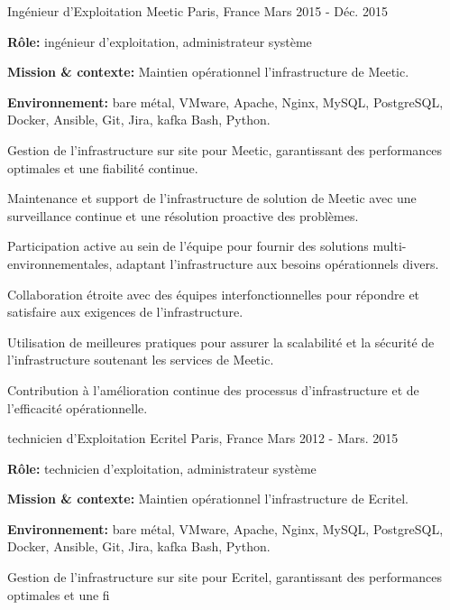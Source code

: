 \begin{cventries}
\cventry
{Ingénieur d'Exploitation} %
{Meetic} %
{Paris, France} %
{Mars 2015 - Déc. 2015} %
{
  \begin{cvitems} %
    \item {\textbf{Rôle:} ingénieur d'exploitation, administrateur système}
    \item {\textbf{Mission \& contexte:} Maintien opérationnel l'infrastructure de Meetic.}
    \item {\textbf{Environnement:} bare métal, VMware, Apache, Nginx, MySQL, PostgreSQL, Docker, Ansible, Git, Jira, kafka Bash, Python.}
    \item {Gestion de l'infrastructure sur site pour Meetic, garantissant des performances optimales et une fiabilité continue.}
    \item {Maintenance et support de l'infrastructure de solution de Meetic avec une surveillance continue et une résolution proactive des problèmes.}
    \item {Participation active au sein de l'équipe pour fournir des solutions multi-environnementales, adaptant l'infrastructure aux besoins opérationnels divers.}
    \item {Collaboration étroite avec des équipes interfonctionnelles pour répondre et satisfaire aux exigences de l'infrastructure.}
    \item {Utilisation de meilleures pratiques pour assurer la scalabilité et la sécurité de l'infrastructure soutenant les services de Meetic.}
    \item {Contribution à l'amélioration continue des processus d'infrastructure et de l'efficacité opérationnelle.}
  \end{cvitems}
}

\cventry
{technicien d'Exploitation} %
{Ecritel} %
{Paris, France} %
{Mars 2012 - Mars. 2015} %
{
  \begin{cvitems} %
    \item {\textbf{Rôle:} technicien d'exploitation, administrateur système}
    \item {\textbf{Mission \& contexte:} Maintien opérationnel l'infrastructure de Ecritel.}
    \item {\textbf{Environnement:} bare métal, VMware, Apache, Nginx, MySQL, PostgreSQL, Docker, Ansible, Git, Jira, kafka Bash, Python.}
    \item {Gestion de l'infrastructure sur site pour Ecritel, garantissant des performances optimales et une fi}
  \end{cvitems}
}
\end{cventries}
